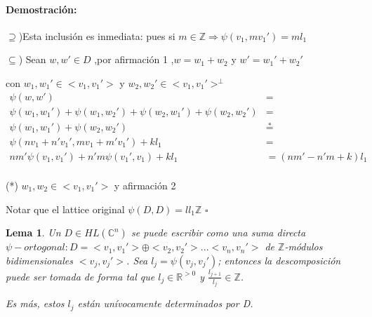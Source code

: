\documentclass[12pt]{article}
\newtheorem{lemma}{Lema}
\newenvironment{proof}{\paragraph{Demostración:}}{\hfill$\square$}
\begin{document}
\begin{proof}
 $\supseteq$)Esta inclusión es inmediata: pues si $m \in \mathbb{Z} \Rightarrow \psi(v_1,m v_1') = m l_1$
 
 $\subseteq$) Sean $w,w' \in D$ ,por afirmación 1 ,$w = w_1 +w_2$  y $w'=w_1' +w_2'$
 
  con $w_1,w_1' \in <v_1,v_1'>$ y  $w_2,w_2' \in <v_1,v_1'>^\bot$ 
 $$\begin{aligned}
 \psi(w,w')&=\\
 \psi(w_1,w_1')+ \psi(w_1,w_2')+ \psi(w_2,w_1')+\psi(w_2,w_2')&=\\
 \psi(w_1,w_1')+\psi(w_2,w_2')& \stackrel{*}{=} \\ 
 \psi(n v_1+n' v_1',m v_1+m' v_1') + k l_1 &=\\
 n m' \psi(v_1,v_1')+n' m \psi(v_1',v_1)+ k l_1 &= (n m' - n'm+k)l_1\\
 \end{aligned}$$
 \newline 
 
 (*) $w_1,w_2 \in <v_1,v_1'>$ y afirmación 2
 
 Notar que el lattice original $\psi(D,D)= l l_1 \mathbb{Z} $
\end{proof}

\begin{lemma} \label{1.8}
 Un $D \in HL(\mathbb{C}^n)$ se puede escribir como una suma directa $\psi-ortogonal : D=<v_1,v_1'>\oplus<v_2,v_2'>...<v_n,v_n'>$
 de $\mathbb{Z}$-módulos bidimensionales $<v_j,v_j'>$. Sea $l_j=\psi(v_j,v_j')$; entonces la descomposición puede ser tomada 
 de forma tal que $l_j \in \mathbb{R}^{>0}$ y $\frac{l_{j+1}}{l_j}  \in \mathbb{Z}$.
 
 Es más, estos $l_j$ están unívocamente determinados por D.
\end{lemma}
\end{document}
